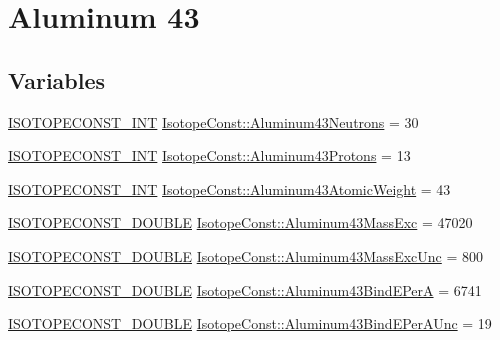 \hypertarget{group___isotope_const-_aluminum-_al43}{}\section{Aluminum 43}
\label{group___isotope_const-_aluminum-_al43}
\subsection*{Variables}
\begin{DoxyCompactItemize}
\item 
\mbox{\hyperlink{group___isotope_const-_macros_ga5f18360b3e99483a35c32d789e62621c}{I\+S\+O\+T\+O\+P\+E\+C\+O\+N\+S\+T\+\_\+\+I\+NT}} \mbox{\hyperlink{group___isotope_const-_aluminum-_al43_ga69345477c86e84fdc9bbe6d2b6b639d1}{Isotope\+Const\+::\+Aluminum43\+Neutrons}} = 30
\item 
\mbox{\hyperlink{group___isotope_const-_macros_ga5f18360b3e99483a35c32d789e62621c}{I\+S\+O\+T\+O\+P\+E\+C\+O\+N\+S\+T\+\_\+\+I\+NT}} \mbox{\hyperlink{group___isotope_const-_aluminum-_al43_ga8665794ac3a2f08554ed0d8eabcb426a}{Isotope\+Const\+::\+Aluminum43\+Protons}} = 13
\item 
\mbox{\hyperlink{group___isotope_const-_macros_ga5f18360b3e99483a35c32d789e62621c}{I\+S\+O\+T\+O\+P\+E\+C\+O\+N\+S\+T\+\_\+\+I\+NT}} \mbox{\hyperlink{group___isotope_const-_aluminum-_al43_gaddbde51b3b50c975e01853e99abd9b23}{Isotope\+Const\+::\+Aluminum43\+Atomic\+Weight}} = 43
\item 
\mbox{\hyperlink{group___isotope_const-_macros_ga8f45a7272ce02c0b4c65c44636ed719a}{I\+S\+O\+T\+O\+P\+E\+C\+O\+N\+S\+T\+\_\+\+D\+O\+U\+B\+LE}} \mbox{\hyperlink{group___isotope_const-_aluminum-_al43_ga3ae4867d245fabea39d84daa31f5eb82}{Isotope\+Const\+::\+Aluminum43\+Mass\+Exc}} = 47020
\item 
\mbox{\hyperlink{group___isotope_const-_macros_ga8f45a7272ce02c0b4c65c44636ed719a}{I\+S\+O\+T\+O\+P\+E\+C\+O\+N\+S\+T\+\_\+\+D\+O\+U\+B\+LE}} \mbox{\hyperlink{group___isotope_const-_aluminum-_al43_gafbb9e695eae6f75ed89dc600435dc9d9}{Isotope\+Const\+::\+Aluminum43\+Mass\+Exc\+Unc}} = 800
\item 
\mbox{\hyperlink{group___isotope_const-_macros_ga8f45a7272ce02c0b4c65c44636ed719a}{I\+S\+O\+T\+O\+P\+E\+C\+O\+N\+S\+T\+\_\+\+D\+O\+U\+B\+LE}} \mbox{\hyperlink{group___isotope_const-_aluminum-_al43_gaef452ad6a92808041ae0b2121fc1b483}{Isotope\+Const\+::\+Aluminum43\+Bind\+E\+PerA}} = 6741
\item 
\mbox{\hyperlink{group___isotope_const-_macros_ga8f45a7272ce02c0b4c65c44636ed719a}{I\+S\+O\+T\+O\+P\+E\+C\+O\+N\+S\+T\+\_\+\+D\+O\+U\+B\+LE}} \mbox{\hyperlink{group___isotope_const-_aluminum-_al43_ga347225b8c1e1c52f15e5299ab2001da5}{Isotope\+Const\+::\+Aluminum43\+Bind\+E\+Per\+A\+Unc}} = 19

\end{DoxyCompactItemize}
